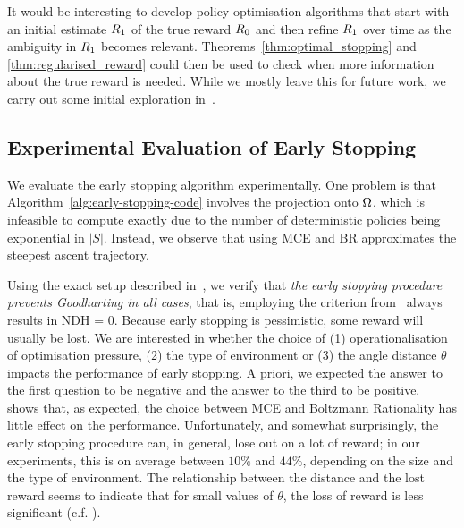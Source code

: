 It would be interesting to develop policy optimisation algorithms that start with an initial estimate $R_1$ of the true reward $R_0$ and then refine $R_1$ over time as the ambiguity in $R_1$ becomes relevant.
Theorems~\ref{thm:optimal_stopping} and \ref{thm:regularised_reward} could then be used to check when more information about the true reward is needed. While we mostly leave this for future work, we carry out some initial exploration in~.





\subsection{Experimental Evaluation of Early Stopping}\label{sec:evaluation}


We evaluate the early stopping algorithm experimentally. One problem is that Algorithm~\ref{alg:early-stopping-code} involves the projection onto $\Omega$, which is infeasible to compute exactly due to the number of deterministic policies being exponential in $|S|$. Instead, we observe that using MCE and BR approximates the steepest ascent trajectory.

Using the exact setup described in~, we verify that \emph{the early stopping procedure prevents Goodharting in all cases}, that is, employing the criterion from~ always results in NDH = 0. Because early stopping is pessimistic, some reward will usually be lost. We are interested in whether the choice of (1) operationalisation of optimisation pressure, (2) the type of environment or (3) the angle distance $\theta$ impacts the performance of early stopping.
%
A priori, we expected the answer to the first question to be negative and the answer to the third to be positive. ~ shows that, as expected, the choice between MCE and Boltzmann Rationality has little effect on the performance. Unfortunately, and somewhat surprisingly, the early stopping procedure can, in general, lose out on a lot of reward; in our experiments, this is on average between $10\%$ and $44\%$, depending on the size and the type of environment. The relationship between the distance and the lost reward seems to indicate that for small values of $\theta$, the loss of reward is less significant (c.f. ).


